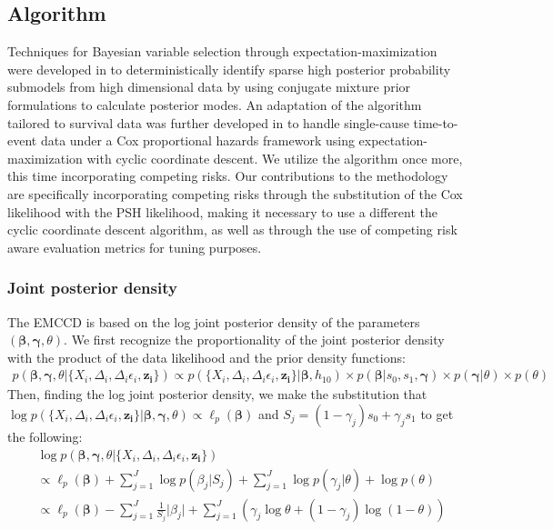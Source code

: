 \documentclass[11pt,a4paper]{article}
\let\cite\parencite
\begin{document}
\subsection{Algorithm}
Techniques for Bayesian variable selection through expectation-maximization were developed in \cite{RockovaGeorge2014} to deterministically identify sparse high posterior probability submodels from high dimensional data by using conjugate mixture prior formulations to calculate posterior modes. An adaptation of the algorithm tailored to survival data was further developed in \cite{Tang2017} to handle single-cause time-to-event data under a Cox proportional hazards framework using expectation-maximization with cyclic coordinate descent. We utilize the algorithm once more, this time incorporating competing risks. Our contributions to the methodology are specifically incorporating competing risks through the substitution of the Cox likelihood with the PSH likelihood, making it necessary to use a different the cyclic coordinate descent algorithm, as well as through the use of competing risk aware evaluation metrics for tuning purposes. 
\subsubsection{Joint posterior density}
The EMCCD is based on the log joint posterior density of the parameters $(\boldsymbol{\beta}, \boldsymbol{\gamma}, \theta)$. We first recognize the proportionality of the joint posterior density with the product of the data likelihood and the prior density functions:
\begin{align*}
    p(\boldsymbol{\beta}, \boldsymbol{\gamma}, \theta| \{X_i, \Delta_i, \Delta_{i}\epsilon_i, \mathbf{z_i}\}) \propto p(\{X_i, \Delta_i, \Delta_{i}\epsilon_i, \mathbf{z_i}\}| \boldsymbol{\beta}, h_{10})\times p(\boldsymbol{\beta}|s_0, s_1, \boldsymbol{\gamma}) \times p(\boldsymbol{\gamma}|\theta) \times p(\theta)
\end{align*}
\noindent Then, finding the log joint posterior density, we make the substitution that $\log p(\{X_i, \Delta_i, \Delta_{i}\epsilon_i, \mathbf{z_i}\}|\boldsymbol{\beta}, \boldsymbol{\gamma}, \theta) \propto \ell_p(\boldsymbol{\beta})$ and $S_j = (1-\gamma_j)s_0 + \gamma_js_1$ to get the following:
\begin{align*}
    & \log p(\boldsymbol{\beta}, \boldsymbol{\gamma}, \theta| \{X_i, \Delta_i, \Delta_{i}\epsilon_i, \mathbf{z_i}\})
     \\ & \propto \ell_p(\boldsymbol{\beta}) + \sum_{j=1}^J \log p(\beta_j|S_j)+ \sum_{j=1}^J  \log p(\gamma_j|\theta) + \log p(\theta)
     \\ & \propto \ell_p(\boldsymbol{\beta})
    - \sum_{j=1}^{J} \frac{1}{S_j} \lvert \beta_j \rvert + 
    \sum_{j=1}^{J}\left(\gamma_j \log \theta + (1 - \gamma_j)\log(1 - \theta)\right)
\end{align*}
\end{document}
